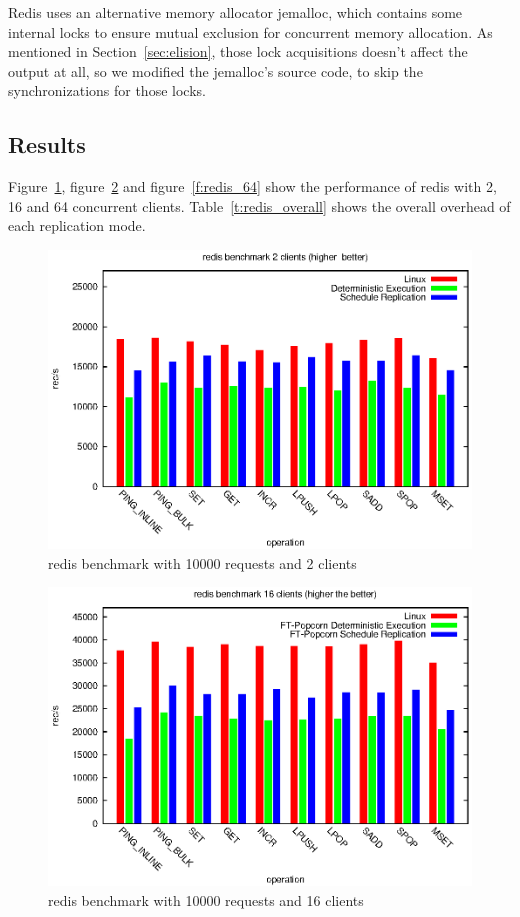 Redis uses an alternative memory allocator jemalloc, which contains some internal locks to ensure mutual exclusion for concurrent memory allocation. As mentioned in Section~\ref{sec:elision}, those lock acquisitions doesn't affect the output at all, so we modified the jemalloc's source code, to skip the synchronizations for those locks.

\subsection{Results}
Figure~\ref{f:redis_2}, figure~\ref{f:redis_16} and figure~\ref{f:redis_64} show the  performance of redis with 2, 16 and 64 concurrent clients. Table~\ref{t:redis_overall} shows the overall overhead of each replication mode. 

\begin{figure}
\centering
\includegraphics[width=0.8\columnwidth]{figures/redis_2}
\caption{redis benchmark with 10000 requests and 2 clients}
\label{f:redis_2}
\end{figure}

\begin{figure}
\centering
\includegraphics[width=0.8\columnwidth]{figures/redis_16}
\caption{redis benchmark with 10000 requests and 16 clients}
\label{f:redis_16}
\end{figure}

